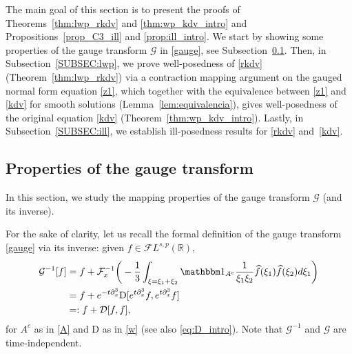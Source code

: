 \documentclass[a4paper,
11pt,  reqno]{amsart}
\newcommand{\5}{\textup{V}}
\newcommand{\FL}{\mathcal{F} L}
\newcommand{\ft}{\widehat}
\newcommand{\ind}{\mathbbm 1}
\newcommand{\dx}{\partial_x}
\theoremstyle{remark}
\newcommand{\R}{\mathbb{R}}
\newcommand{\Ft}{{\mathcal{F}}}
\newcommand{\Gc}{\mathcal{G}}
\numberwithin{equation}{section}
\numberwithin{theorem}{section}
\newcommand{\D}{\mathrm{D}}
\newcommand{\DD}{\mathcal{D}}
\begin{document}
The main goal of this section is to present the proofs of Theorems~\ref{thm:lwp_rkdv} and \ref{thm:wp_kdv_intro} and Propositions~\ref{prop_C3_ill} and \ref{prop:ill_intro}.
We start by showing some properties of the gauge transform $\Gc$ in \eqref{gauge}, see Subsection~\ref{sec:gauge_prop}. 
Then, in Subsection~\ref{SUBSEC:lwp}, we prove well-posedness of \eqref{rkdv} (Theorem~\ref{thm:lwp_rkdv}) via a contraction mapping argument on the gauged normal form equation \eqref{z1}, which together with the equivalence between \eqref{z1} and \eqref{kdv} for smooth solutions (Lemma~\ref{lem:equivalencia}), gives well-posedness of the original equation \eqref{kdv} (Theorem~\ref{thm:wp_kdv_intro}).
Lastly, in Subsection~\ref{SUBSEC:ill}, we establish ill-posedness results for \eqref{rkdv} and~\eqref{kdv}. 




\subsection{Properties of the gauge transform}\label{sec:gauge_prop}
In this section, we study the mapping properties of the gauge transform $\Gc$ (and its inverse).

For the sake of clarity, let us recall the formal definition of the gauge transform \eqref{gauge} via its inverse: given
$f \in \FL^{s,p}(\R)$,
\begin{align}\label{gauge1}
    \Gc^{-1}[f] 
    &
    = f + \Ft_x^{-1}\bigg( - \frac{1}{3} \int_{\xi=\xi_1+\xi_2} \ind_{A^c} \frac{1}{\xi_1\xi_2} \ft{f}(\xi_1) \ft{f}(\xi_2) d\xi_1 \bigg)\\&=f + e^{-t\dx^3} \D[e^{t\dx^3} f , e^{t\dx^3}f]
    \\
    &
     =: f + \DD [f, f]
    ,
\end{align}
for $A^c$ as in \eqref{A} and $\D$ as in \eqref{w} (see also \eqref{eq:D_intro}).
Note that $\Gc^{-1}$ and  $\Gc$ are time-independent. 
\end{document}
